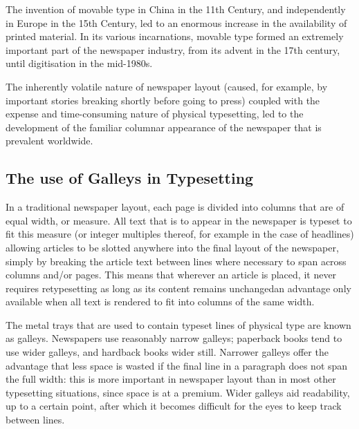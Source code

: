 The invention of movable type in China in the 11th Century, and independently in Europe in the 15th Century, led to an enormous increase in the availability of printed material. In its various incarnations, movable type formed an extremely important part of the newspaper industry, from its advent in the 17th century, until digitisation in the mid-1980s.

The inherently volatile nature of newspaper layout (caused, for example, by important stories breaking shortly before going to press) coupled with the expense and time-consuming nature of physical typesetting, led to the development of the familiar columnar appearance of the newspaper that is prevalent worldwide.

\subsection{The use of Galleys in Typesetting}
\label{sec:galleys}
In a traditional newspaper layout, each page is divided into columns that are of equal width, or \gls{measure}. All text that is to appear in the newspaper is typeset to fit this measure (or integer multiples thereof, for example in the case of headlines) allowing articles to be slotted anywhere into the final layout of the newspaper, simply by breaking the article text between lines where necessary to span across columns and/or pages. This means that wherever an article is placed, it never requires retypesetting as long as its content remains unchanged\ed{}an advantage only available when all text is rendered to fit into columns of the same width.


The metal trays that are used to contain typeset lines of physical type are known as \glspl{galley}. Newspapers  use reasonably narrow galleys; paperback books tend to use wider galleys, and hardback books wider still. Narrower galleys offer the advantage that less space is wasted if the final line in a paragraph does not span the full width: this is more important in newspaper layout than in most other typesetting situations, since space is at a premium. Wider galleys aid readability, up to a certain point, after which it becomes difficult for the eyes to keep track between lines.\hspace{0pt}\cite{Bringhurst2008, Braganza2009, Voorhees2011}



